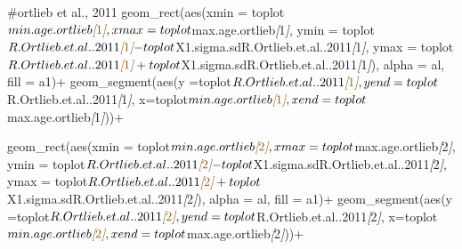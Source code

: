 \documentclass[
]{article}
\newenvironment{Shaded}{\begin{snugshade}}{\end{snugshade}}
\newcommand{\CommentTok}[1]{\textcolor[rgb]{0.56,0.35,0.01}{\textit{#1}}}
\newcommand{\NormalTok}[1]{#1}
\newcommand{\OtherTok}[1]{\textcolor[rgb]{0.56,0.35,0.01}{#1}}
\begin{document}
\begin{Shaded}
\begin{Highlighting}[]
\NormalTok{  \#ortlieb et al., 2011}
\NormalTok{  geom\_rect(aes(xmin = toplot$min.age.ortlieb}\CommentTok{[}\OtherTok{1}\CommentTok{]}\NormalTok{, }
\NormalTok{                xmax = toplot$max.age.ortlieb}\CommentTok{[}\OtherTok{1}\CommentTok{]}\NormalTok{, }
\NormalTok{                ymin = toplot$R.Ortlieb.et.al..2011}\CommentTok{[}\OtherTok{1}\CommentTok{]}\NormalTok{{-}toplot$X1.sigma.sdR.Ortlieb.et.al..2011}\CommentTok{[}\OtherTok{1}\CommentTok{]}\NormalTok{,}
\NormalTok{                ymax = toplot$R.Ortlieb.et.al..2011}\CommentTok{[}\OtherTok{1}\CommentTok{]}\NormalTok{+toplot$X1.sigma.sdR.Ortlieb.et.al..2011}\CommentTok{[}\OtherTok{1}\CommentTok{]}\NormalTok{),}
\NormalTok{                alpha = al,}
\NormalTok{                fill = a1)+}
\NormalTok{  geom\_segment(aes(y =toplot$R.Ortlieb.et.al..2011}\CommentTok{[}\OtherTok{1}\CommentTok{]}\NormalTok{,}
\NormalTok{                   yend =toplot$R.Ortlieb.et.al..2011}\CommentTok{[}\OtherTok{1}\CommentTok{]}\NormalTok{,}
\NormalTok{                   x=toplot$min.age.ortlieb}\CommentTok{[}\OtherTok{1}\CommentTok{]}\NormalTok{,}
\NormalTok{                   xend=toplot$max.age.ortlieb}\CommentTok{[}\OtherTok{1}\CommentTok{]}\NormalTok{))+}
  
\NormalTok{  geom\_rect(aes(xmin = toplot$min.age.ortlieb}\CommentTok{[}\OtherTok{2}\CommentTok{]}\NormalTok{, }
\NormalTok{                xmax = toplot$max.age.ortlieb}\CommentTok{[}\OtherTok{2}\CommentTok{]}\NormalTok{, }
\NormalTok{                ymin = toplot$R.Ortlieb.et.al..2011}\CommentTok{[}\OtherTok{2}\CommentTok{]}\NormalTok{{-}toplot$X1.sigma.sdR.Ortlieb.et.al..2011}\CommentTok{[}\OtherTok{2}\CommentTok{]}\NormalTok{,}
\NormalTok{                ymax = toplot$R.Ortlieb.et.al..2011}\CommentTok{[}\OtherTok{2}\CommentTok{]}\NormalTok{+toplot$X1.sigma.sdR.Ortlieb.et.al..2011}\CommentTok{[}\OtherTok{2}\CommentTok{]}\NormalTok{),}
\NormalTok{            alpha = al,}
\NormalTok{            fill = a1)+}
\NormalTok{  geom\_segment(aes(y =toplot$R.Ortlieb.et.al..2011}\CommentTok{[}\OtherTok{2}\CommentTok{]}\NormalTok{,}
\NormalTok{                   yend =toplot$R.Ortlieb.et.al..2011}\CommentTok{[}\OtherTok{2}\CommentTok{]}\NormalTok{,}
\NormalTok{                   x=toplot$min.age.ortlieb}\CommentTok{[}\OtherTok{2}\CommentTok{]}\NormalTok{,}
\NormalTok{                   xend=toplot$max.age.ortlieb}\CommentTok{[}\OtherTok{2}\CommentTok{]}\NormalTok{))+}
  

\end{Highlighting}
\end{Shaded}
\end{document}
